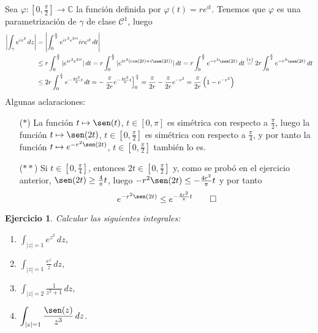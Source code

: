 \documentclass[11pt]{report}
\makeatletter
\renewenvironment{proof}[1][\proofname]{\par
  \pushQED{\qed}%
  \normalfont \topsep\z@skip %
  \trivlist
  \item[\hskip\labelsep
        \itshape
    #1\@addpunct{.}]\ignorespaces
}{%
  \popQED\endtrivlist\@endpefalse
}
\newcommand{\C}{\mathbb C}
\newtheorem{exercise}{Ejercicio}
\makeatother
\begin{document}
\begin{proof}
Sea $\varphi \colon [0,\frac{\pi}{2}] \to \C$ la función definida por $\varphi(t) = re^{it}$. Tenemos que $\varphi$ es una parametrización de $\gamma$ de clase $\mathcal{C}^1$, luego
\[
\begin{aligned}[t]
\left|\int_\gamma e^{iz^2} \, dz\right| &=\left|\int_0^{\frac{\pi}{2}} e^{ir^2e^{2it}}ire^{it} \, dt\right| \\ &\leq  r\int_0^{\frac{\pi}{2}} |e^{ir^2e^{2it}}| \, dt = r\int_0^{\frac{\pi}{2}} |e^{ir^2(\cos(2t)+i\sen(2t))}| \, dt = r\int_0^{\frac{\pi}{2}} e^{-r^2\sen(2t)} \, dt \overset{(*)}{=} 2r\int_0^{\frac{\pi}{4}} e^{-r^2\sen(2t)} \, dt \\
&\leq 2r\int_0^{\frac{\pi}{4}}e^{-\frac{4r^2}{\pi}t} \, dt =- \left.\frac{\pi}{2r}e^{-\frac{4r^2}{\pi}t}\right]_0^{\frac{\pi}{4}} = \frac{\pi}{2r}-\frac{\pi}{2r}e^{-r^2} = \frac{\pi}{2r}\left(1-e^{-r^2}\right)
\end{aligned}
\]
Algunas aclaraciones:
\begin{itemize}
    \item[($*$)] La función $t \mapsto \sen(t)$, $t \in [0,\pi]$ es simétrica con respecto a $\frac{\pi}{2}$, luego la función $t \mapsto \sen(2t)$, $t \in [0,\frac{\pi}{2}]$ es simétrica con respecto a $\frac{\pi}{4}$, y por tanto la función $t \mapsto e^{-r^2\sen(2t)}$, $t \in [0,\frac{\pi}{2}]$ también lo es.
    \item[($**$)] Si $t \in [0,\frac{\pi}{4}]$, entonces $2t \in [0,\frac{\pi}{2}]$ y, como se probó en el ejercicio anterior, $\sen(2t) \geq \frac{4}{\pi}t$, luego $-r^2\sen(2t) \leq -\frac{4r^2}{\pi}t$ y por tanto \[e^{-r^2\sen(2t)} \leq e^{-\frac{4r^2}{\pi}t} \qedhere\]
\end{itemize}
\end{proof}

\begin{exercise}
Calcular las siguientes integrales:
\begin{multicols}{4}
\centering
\begin{enumerate}
    \item $\displaystyle \int_{|z|=1} e^{z^2} \, dz$,
    \item $\displaystyle \int_{|z| = 1} \frac{e^z}{z} \, dz$,
    \item $\displaystyle \int_{|z| = 2}\frac{1}{z^2+1} \, dz$,
    \item $\displaystyle \int_{|z| = 1}\frac{\sen(z)}{z^3} \, dz$.
\end{enumerate}
\end{multicols}
\end{exercise}
\end{document}
